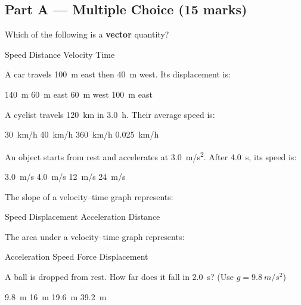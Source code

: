 \documentclass[addpoints]{exam}
\begin{document}
\newpage
\begin{questions}

\section*{Part A --- Multiple Choice (15 marks)}
\vspace{5mm}

\question[1] Which of the following is a \textbf{vector} quantity?
\begin{choices}
    \choice Speed
    \choice Distance
    \correctchoice Velocity
    \choice Time
\end{choices}

\question[1] A car travels \SI{100}{m} east then \SI{40}{m} west. Its displacement is:
\begin{choices}
    \choice \SI{140}{m}
    \correctchoice \SI{60}{m} east
    \choice \SI{60}{m} west
    \choice \SI{100}{m} east
\end{choices}

\question[1] A cyclist travels \SI{120}{km} in \SI{3.0}{h}. Their average speed is:
\begin{choices}
    \choice \SI{30}{km/h}
    \correctchoice \SI{40}{km/h}
    \choice \SI{360}{km/h}
    \choice \SI{0.025}{km/h}
\end{choices}

\question[1] An object starts from rest and accelerates at \SI{3.0}{m/s^2}. After
\SI{4.0}{s}, its speed is:
\begin{choices}
    \choice \SI{3.0}{m/s}
    \choice \SI{4.0}{m/s}
    \correctchoice \SI{12}{m/s}
    \choice \SI{24}{m/s}
\end{choices}

\question[1] The slope of a velocity--time graph represents:
\begin{choices}
    \choice Speed
    \choice Displacement
    \correctchoice Acceleration
    \choice Distance
\end{choices}

\question[1] The area under a velocity--time graph represents:
\begin{choices}
    \choice Acceleration
    \choice Speed
    \choice Force
    \correctchoice Displacement
\end{choices}

\question[1] A ball is dropped from rest. How far does it fall in \SI{2.0}{s}?
(Use $g = \SI{9.8}{m/s^2}$)
\begin{choices}
    \choice \SI{9.8}{m}
    \choice \SI{16}{m}
    \correctchoice \SI{19.6}{m}
    \choice \SI{39.2}{m}
\end{choices}


\end{questions}
\end{document}
